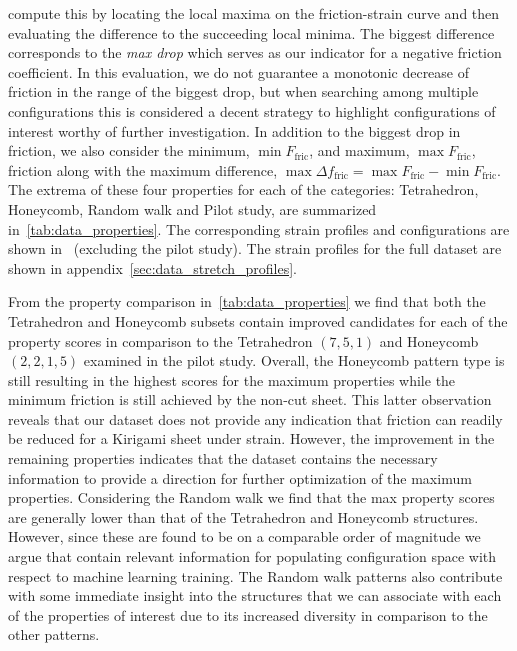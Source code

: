 compute this by locating the local maxima on the friction-strain curve and then
evaluating the difference to the succeeding local minima. The biggest difference
corresponds to the \textit{max drop} which serves as our indicator for a
negative friction coefficient. In this evaluation, we do not guarantee a
monotonic decrease of friction in the range of the biggest drop, but when
searching among multiple configurations this is considered a decent strategy to
highlight configurations of interest worthy of further investigation. In
addition to the biggest drop in friction, we also consider the minimum, $\min
F_{\text{fric}}$, and maximum, $\max F_{\text{fric}}$, friction along with the
maximum difference, $\max \Delta f_{\text{fric}} = \max F_{\text{fric}} - \min
F_{\text{fric}}$. The extrema of these four properties for each of the
categories: Tetrahedron, Honeycomb, Random walk and Pilot study, are summarized
in~\cref{tab:data_properties}. The corresponding strain profiles and
configurations are shown in~ (excluding
the pilot study). The strain profiles for the full dataset are shown in
appendix~\ref {sec:data_stretch_profiles}. 

From the property comparison in~\cref{tab:data_properties} we find that both the
Tetrahedron and Honeycomb subsets contain improved candidates for each of the
property scores in comparison to the Tetrahedron $(7,5,1)$ and Honeycomb
$(2,2,1,5)$ examined in the pilot study. Overall, the Honeycomb pattern type is
still resulting in the highest scores for the maximum properties while the
minimum friction is still achieved by the non-cut sheet. This latter observation
reveals that our dataset does not provide any indication that friction can readily be reduced for a Kirigami sheet under strain. However, the improvement in the
remaining properties indicates that the dataset contains the necessary
information to provide a direction for further optimization of the maximum properties. Considering the Random walk we find that the max property scores are generally lower than that of the Tetrahedron and Honeycomb structures. However, since these are found to be on a comparable order of magnitude we argue that contain relevant information for populating configuration space with respect to machine learning training. The Random walk patterns also contribute with some immediate insight into the structures that we can associate with each of the properties of interest due to its increased diversity in comparison to the other patterns.

